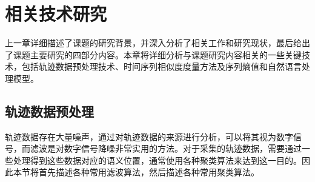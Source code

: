 \chapter{相关技术研究}
\label{chap:chapter02}
上一章详细描述了课题的研究背景，并深入分析了相关工作和研究现状，最后给出了课题主要研究的四部分内容。本章将详细分析与课题研究内容相关的一些关键技术，包括轨迹数据预处理技术、时间序列相似度度量方法及序列熵值和自然语言处理模型。
\section{轨迹数据预处理}
\label{sec:section2-1}
轨迹数据存在大量噪声，通过对轨迹数据的来源进行分析，可以将其视为数字信号，而滤波是对数字信号降噪非常实用的方法。对于采集的轨迹数据，需要通过一些处理得到这些数据对应的语义位置，通常使用各种聚类算法来达到这一目的。因此本节将首先描述各种常用滤波算法，然后描述各种常用聚类算法。
